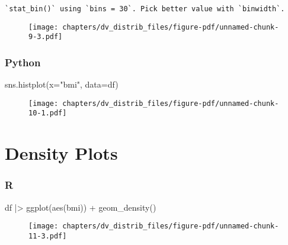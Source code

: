 \documentclass[
  letterpaper,
  DIV=11,
  numbers=noendperiod]{scrreprt}
\newenvironment{Shaded}{\begin{snugshade}}{\end{snugshade}}
\newcommand{\FunctionTok}[1]{\textcolor[rgb]{0.28,0.35,0.67}{#1}}
\newcommand{\NormalTok}[1]{\textcolor[rgb]{0.00,0.46,0.62}{#1}}
\newcommand{\OperatorTok}[1]{\textcolor[rgb]{0.37,0.37,0.37}{#1}}
\newcommand{\SpecialCharTok}[1]{\textcolor[rgb]{0.37,0.37,0.37}{#1}}
\newcommand{\StringTok}[1]{\textcolor[rgb]{0.13,0.47,0.30}{#1}}
\begin{document}
\begin{verbatim}
`stat_bin()` using `bins = 30`. Pick better value with `binwidth`.
\end{verbatim}

\begin{figure}[H]

{\centering \texttt{[image: chapters/dv\_distrib\_files/figure-pdf/unnamed-chunk-9-3.pdf]}

}

\end{figure}

\hypertarget{python-46}{%
\subsubsection{Python}\label{python-46}}

\begin{Shaded}
\begin{Highlighting}[]
\NormalTok{sns.histplot(x}\OperatorTok{=}\StringTok{"bmi"}\NormalTok{, data}\OperatorTok{=}\NormalTok{df)}
\end{Highlighting}
\end{Shaded}

\begin{figure}[H]

{\centering \texttt{[image: chapters/dv\_distrib\_files/figure-pdf/unnamed-chunk-10-1.pdf]}

}

\end{figure}

\hypertarget{density-plots}{%
\section{Density Plots}\label{density-plots}}

\hypertarget{r-47}{%
\subsubsection{R}\label{r-47}}

\begin{Shaded}
\begin{Highlighting}[]
\NormalTok{df }\SpecialCharTok{|\textgreater{}} 
    \FunctionTok{ggplot}\NormalTok{(}\FunctionTok{aes}\NormalTok{(bmi)) }\SpecialCharTok{+}
    \FunctionTok{geom\_density}\NormalTok{()}
\end{Highlighting}
\end{Shaded}

\begin{figure}[H]

{\centering \texttt{[image: chapters/dv\_distrib\_files/figure-pdf/unnamed-chunk-11-3.pdf]}

}

\end{figure}
\end{document}
